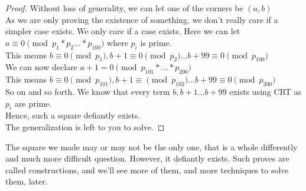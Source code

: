 \begin{proof}
    Without loss of generality, we can let one of the corners be $(a,b)$\\
    As we are only proving the existence of something, we don't really care if a simpler case exists. We only care if a case exists. Here we can let $a \equiv 0 \pmod{p_1*p_2\dots*p_{100}}$  where $p_i$ is prime.\\
    This means $b \equiv 0 \pmod{p_1}, b+1 \equiv 0 \pmod{p_2} \dots b+99 \equiv 0 \pmod{p_{100}}$\\
    We can now declare $a+1= 0 \pmod{p_{101}*\dots*p_{200}}$\\
    This means $b \equiv 0 \pmod{p_{101}}, b+1 \equiv \pmod{p_{102}} \dots b+99 \equiv 0\pmod{p_{200}}$\\
    So on and so forth. We know that every term $b, b+1 \dots b+99$ exists using CRT as $p_i$ are prime.\\
    Hence, such a square defiantly exists.\\
    The generalization is left to you to solve.
\end{proof}
The square we made may or may not be the only one, that is a whole differently and much more difficult question. However, it defiantly exists. Such proves are called constructions, and we'll see more of them, and more techniques to solve them, later.
